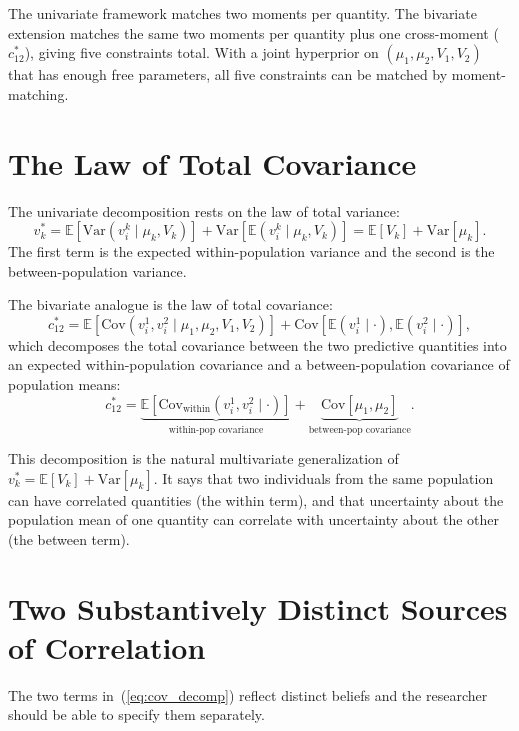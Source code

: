 \documentclass[11pt,a4paper]{article}
\theoremstyle{definition}
\newcommand{\E}{\mathbb{E}}
\newcommand{\Var}{\mathrm{Var}}
\newcommand{\Cov}{\mathrm{Cov}}
\newcommand{\dpv}{v^*}
\newcommand{\dpc}{c^*}
\begin{document}
The univariate framework matches two moments per quantity. The bivariate
extension matches the same two moments per quantity plus one cross-moment
($\dpc_{12}$), giving five constraints total. With a joint hyperprior on
$(\mu_1, \mu_2, V_1, V_2)$ that has enough free parameters, all five
constraints can be matched by moment-matching.

\section{The Law of Total Covariance}

The univariate decomposition rests on the law of total variance:
\begin{equation}
  \dpv_k
  = \E[\Var(v_i^k \mid \mu_k, V_k)] + \Var[\E(v_i^k \mid \mu_k, V_k)]
  = \E[V_k] + \Var[\mu_k].
\end{equation}
The first term is the expected within-population variance and the
second is the between-population variance.

The bivariate analogue is the law of total covariance:
\begin{equation}
  \label{eq:total_cov}
  \dpc_{12}
  = \E[\Cov(v_i^1, v_i^2 \mid \mu_1, \mu_2, V_1, V_2)]
  + \Cov[\E(v_i^1 \mid \cdot), \E(v_i^2 \mid \cdot)],
\end{equation}
which decomposes the total covariance between the two predictive
quantities into an expected within-population covariance and a
between-population covariance of population means:
\begin{equation}
  \label{eq:cov_decomp}
  \dpc_{12}
  = \underbrace{\E[\Cov_{\text{within}}(v_i^1, v_i^2 \mid \cdot)]}
        _{\text{within-pop covariance}}
  + \underbrace{\Cov[\mu_1, \mu_2]}_{\text{between-pop covariance}}.
\end{equation}

This decomposition is the natural multivariate generalization of
$\dpv_k = \E[V_k] + \Var[\mu_k]$. It says that two individuals from the
same population can have correlated quantities (the within term), and
that uncertainty about the population mean of one quantity can correlate
with uncertainty about the other (the between term).

\section{Two Substantively Distinct Sources of Correlation}

The two terms in~(\ref{eq:cov_decomp}) reflect distinct beliefs and the
researcher should be able to specify them separately.
\end{document}
